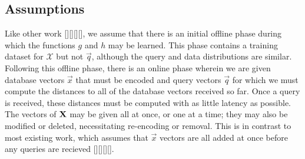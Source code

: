 




\subsection{Assumptions}

Like other work [][][][], we assume that there is an initial offline phase during which the functions $g$ and $h$ may be learned. This phase contains a training dataset for $\mathcal{X}$ but not $\vec{q}$, although the query and data distributions are similar. Following this offline phase, there is an online phase wherein we are given database vectors $\vec{x}$ that must be encoded and query vectors $\vec{q}$ for which we must compute the distances to all of the database vectors received so far. Once a query is received, these distances must be computed with as little latency as possible. The vectors of $\mathbf{X}$ may be given all at once, or one at a time; they may also be modified or deleted, necessitating re-encoding or removal. This is in contrast to most existing work, which assumes that $\vec{x}$ vectors are all added at once before any queries are recieved [][][][].

